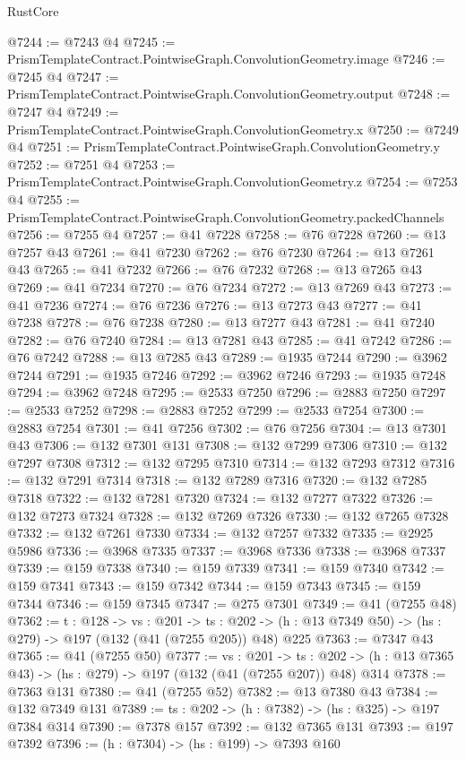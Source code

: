 \begin{lexlean}{RustCore}
\begin{coremodule}
@7244 := @7243 @4
@7245 := PrismTemplateContract.PointwiseGraph.ConvolutionGeometry.image
@7246 := @7245 @4
@7247 := PrismTemplateContract.PointwiseGraph.ConvolutionGeometry.output
@7248 := @7247 @4
@7249 := PrismTemplateContract.PointwiseGraph.ConvolutionGeometry.x
@7250 := @7249 @4
@7251 := PrismTemplateContract.PointwiseGraph.ConvolutionGeometry.y
@7252 := @7251 @4
@7253 := PrismTemplateContract.PointwiseGraph.ConvolutionGeometry.z
@7254 := @7253 @4
@7255 := PrismTemplateContract.PointwiseGraph.ConvolutionGeometry.packedChannels
@7256 := @7255 @4
@7257 := @41 @7228
@7258 := @76 @7228
@7260 := @13 @7257 @43
@7261 := @41 @7230
@7262 := @76 @7230
@7264 := @13 @7261 @43
@7265 := @41 @7232
@7266 := @76 @7232
@7268 := @13 @7265 @43
@7269 := @41 @7234
@7270 := @76 @7234
@7272 := @13 @7269 @43
@7273 := @41 @7236
@7274 := @76 @7236
@7276 := @13 @7273 @43
@7277 := @41 @7238
@7278 := @76 @7238
@7280 := @13 @7277 @43
@7281 := @41 @7240
@7282 := @76 @7240
@7284 := @13 @7281 @43
@7285 := @41 @7242
@7286 := @76 @7242
@7288 := @13 @7285 @43
@7289 := @1935 @7244
@7290 := @3962 @7244
@7291 := @1935 @7246
@7292 := @3962 @7246
@7293 := @1935 @7248
@7294 := @3962 @7248
@7295 := @2533 @7250
@7296 := @2883 @7250
@7297 := @2533 @7252
@7298 := @2883 @7252
@7299 := @2533 @7254
@7300 := @2883 @7254
@7301 := @41 @7256
@7302 := @76 @7256
@7304 := @13 @7301 @43
@7306 := @132 @7301 @131
@7308 := @132 @7299 @7306
@7310 := @132 @7297 @7308
@7312 := @132 @7295 @7310
@7314 := @132 @7293 @7312
@7316 := @132 @7291 @7314
@7318 := @132 @7289 @7316
@7320 := @132 @7285 @7318
@7322 := @132 @7281 @7320
@7324 := @132 @7277 @7322
@7326 := @132 @7273 @7324
@7328 := @132 @7269 @7326
@7330 := @132 @7265 @7328
@7332 := @132 @7261 @7330
@7334 := @132 @7257 @7332
@7335 := @2925 @5986
@7336 := @3968 @7335
@7337 := @3968 @7336
@7338 := @3968 @7337
@7339 := @159 @7338
@7340 := @159 @7339
@7341 := @159 @7340
@7342 := @159 @7341
@7343 := @159 @7342
@7344 := @159 @7343
@7345 := @159 @7344
@7346 := @159 @7345
@7347 := @275 @7301
@7349 := @41 (@7255 @48)
@7362 := {t : @128} ->
  {vs : @201} ->
  {ts : @202} -> (h : @13 @7349 @50) -> (hs : @279) -> @197 (@132 (@41 (@7255 @205)) @48) @225
@7363 := @7347 @43
@7365 := @41 (@7255 @50)
@7377 := {vs : @201} ->
  {ts : @202} -> (h : @13 @7365 @43) -> (hs : @279) -> @197 (@132 (@41 (@7255 @207)) @48) @314
@7378 := @7363 @131
@7380 := @41 (@7255 @52)
@7382 := @13 @7380 @43
@7384 := @132 @7349 @131
@7389 := {ts : @202} -> (h : @7382) -> (hs : @325) -> @197 @7384 @314
@7390 := @7378 @157
@7392 := @132 @7365 @131
@7393 := @197 @7392
@7396 := (h : @7304) -> (hs : @199) -> @7393 @160

\end{coremodule}
\end{lexlean}
